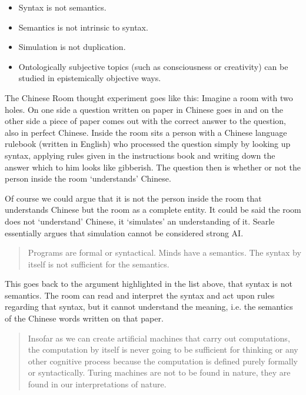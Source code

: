 \begin{itemize}
  \item Syntax is not semantics.
  \item Semantics is not intrinsic to syntax.
  \item Simulation is not duplication.
  \item Ontologically subjective topics (such as consciousness or creativity) can be studied in epistemically objective ways.
\end{itemize}

The Chinese Room thought experiment goes like this: Imagine a room with two holes. On one side a question written on paper in Chinese goes in and on the other side a piece of paper comes out with the correct answer to the question, also in perfect Chinese. Inside the room sits a person with a Chinese language rulebook (written in English) who processed the question simply by looking up syntax, applying rules given in the instructions book and writing down the answer which to him looks like gibberish. The question then is whether or not the person inside the room `understands' Chinese.

Of course we could argue that it is not the person inside the room that understands Chinese but the room as a complete entity. It could be said the room does not `understand' Chinese, it `simulates' an understanding of it. Searle essentially argues that simulation cannot be considered strong \ac{AI}.

\begin{quotation}
  Programs are formal or syntactical. Minds have a semantics. The syntax by itself is not sufficient for the semantics. 
\end{quotation}

This goes back to the argument highlighted in the list above, that syntax is not semantics. The room can read and interpret the syntax and act upon rules regarding that syntax, but it cannot understand the meaning, i.e. the semantics of the Chinese words written on that paper.

\begin{quotation}
  Insofar as we can create artificial machines that carry out computations, the computation by itself is never going to be sufficient for thinking or any other cognitive process because the computation is defined purely formally or syntactically. Turing machines are not to be found in nature, they are found in our interpretations of nature. 
\end{quotation}

